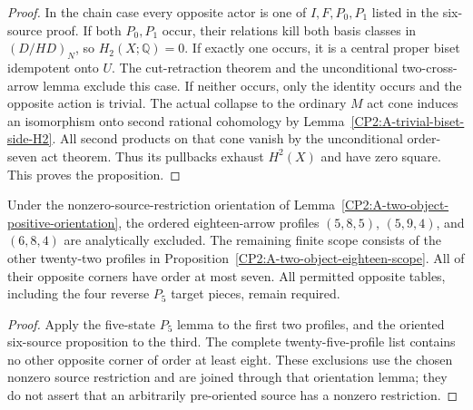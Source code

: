 \begin{proof}
In the chain case every opposite actor is one of
$I,F,P_0,P_1$ listed in the six-source proof. If both
$P_0,P_1$ occur, their relations kill both basis classes
in $(D/HD)_N$, so $H_2(X;\mathbb Q)=0$.
If exactly one occurs, it is a central proper biset
idempotent onto $U$. The cut-retraction theorem and the
unconditional two-cross-arrow lemma exclude this case.
If neither occurs, only the identity occurs and the
opposite action is trivial. The actual collapse to the
ordinary $M$ act cone induces an isomorphism onto second
rational cohomology by
Lemma~\ref{CP2:A-trivial-biset-side-H2}. All second
products on that cone vanish by the unconditional
order-seven act theorem. Thus its pullbacks exhaust
$H^2(X)$ and have zero square. This proves the proposition.
\end{proof}

\begin{corollary}
\label{CP2:A-two-object-eighteen-oriented-twenty-two}
Under the nonzero-source-restriction orientation of
Lemma~\ref{CP2:A-two-object-positive-orientation}, the
ordered eighteen-arrow profiles $(5,8,5)$, $(5,9,4)$,
and $(6,8,4)$ are analytically excluded. The remaining
finite scope consists of the other twenty-two profiles
in Proposition~\ref{CP2:A-two-object-eighteen-scope}.
All of their opposite corners have order at most seven.
All permitted opposite tables, including the four reverse
$P_5$ target pieces, remain required.
\end{corollary}
\begin{proof}
Apply the five-state $P_5$ lemma to the first two profiles,
and the oriented six-source proposition to the third.
The complete twenty-five-profile list contains no other
opposite corner of order at least eight. These exclusions
use the chosen nonzero source restriction and are joined
through that orientation lemma; they do not assert that
an arbitrarily pre-oriented source has a nonzero
restriction.
\end{proof}

